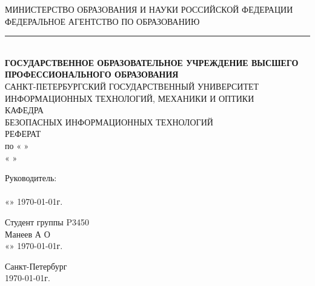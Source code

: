 \begin{titlepage}
	\newpage

	\begin{center}
		\newlength{\HeadLength}
		\settowidth{\HeadLength}{МИНИСТЕРСТВО ОБРАЗОВАНИЯ И НАУКИ РОССИЙСКОЙ ФЕДЕРАЦИИ}
		МИНИСТЕРСТВО ОБРАЗОВАНИЯ И НАУКИ РОССИЙСКОЙ ФЕДЕРАЦИИ\\
		ФЕДЕРАЛЬНОЕ АГЕНТСТВО ПО ОБРАЗОВАНИЮ\\
		\rule{\HeadLength}{0.4mm}\\
		\vspace{1.0cm}
		{\fontsize{8pt}{10}
			\selectfont \textbf{ГОСУДАРСТВЕННОЕ ОБРАЗОВАТЕЛЬНОЕ УЧРЕЖДЕНИЕ ВЫСШЕГО ПРОФЕССИОНАЛЬНОГО ОБРАЗОВАНИЯ}\\
		}
		\vspace{1.0cm}
		САНКТ-ПЕТЕРБУРГСКИЙ ГОСУДАРСТВЕННЫЙ УНИВЕРСИТЕТ\\
		ИНФОРМАЦИОННЫХ ТЕХНОЛОГИЙ, МЕХАНИКИ И ОПТИКИ\\
		\vspace{1.5cm}
		КАФЕДРА\\
		БЕЗОПАСНЫХ ИНФОРМАЦИОННЫХ ТЕХНОЛОГИЙ\\
		\vspace{2.5cm}
		\Large{РЕФЕРАТ}\\
		по
		«
		\textbf{
		}
		»\\
		\vspace{1.0cm}
		«
		\textsc{\textit{
		}}
		»\\
	\end{center}

	\vspace{\fill}

	\newlength{\ML}

	\hfill\begin{minipage}{0.45\textwidth}
	Руководитель:\\
	\underline{\hspace{\ML}}
	\\
	«\underline{\hspace{0.7cm}}» \underline{\hspace{2cm}} \CurrentYear\today г.
	\end{minipage}%
	\bigskip

	\hfill\begin{minipage}{0.45\textwidth}
	Студент группы 
		P3450
	\\
	\underline{\hspace{\ML}}
		Манеев А О
	\\
	«\underline{\hspace{0.7cm}}» \underline{\hspace{2cm}} \CurrentYear\today г.
	\end{minipage}%

	\vspace{2.5cm}

	\begin{center}
	Санкт-Петербург\\
	\CurrentYear\today г.
	\end{center}
	\newpage

\end{titlepage}
